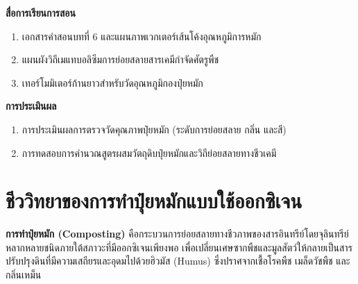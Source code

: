 \noindent\textbf{สื่อการเรียนการสอน}
\begin{enumerate}
    \item เอกสารคำสอนบทที่ 6 และแผนภาพเวกเตอร์เส้นโค้งอุณหภูมิการหมัก
    \item แผนผังวิถีเมแทบอลิซึมการย่อยสลายสารเคมีกำจัดศัตรูพืช
    \item เทอร์โมมิเตอร์ก้านยาวสำหรับวัดอุณหภูมิกองปุ๋ยหมัก
\end{enumerate}

\noindent\textbf{การประเมินผล}
\begin{enumerate}
    \item การประเมินผลการตรวจวัดคุณภาพปุ๋ยหมัก (ระดับการย่อยสลาย กลิ่น และสี)
    \item การทดสอบการคำนวณสูตรผสมวัตถุดิบปุ๋ยหมักและวิถีย่อยสลายทางชีวเคมี
\end{enumerate}

\newpage


\section{ชีววิทยาของการทำปุ๋ยหมักแบบใช้ออกซิเจน}

\textbf{การทำปุ๋ยหมัก (Composting)} คือกระบวนการย่อยสลายทางชีวภาพของสารอินทรีย์โดยจุลินทรีย์หลากหลายชนิดภายใต้สภาวะที่มีออกซิเจนเพียงพอ เพื่อเปลี่ยนเศษซากพืชและมูลสัตว์ให้กลายเป็นสารปรับปรุงดินที่มีความเสถียรและอุดมไปด้วยฮิวมัส (Humus) ซึ่งปราศจากเชื้อโรคพืช เมล็ดวัชพืช และกลิ่นเหม็น

